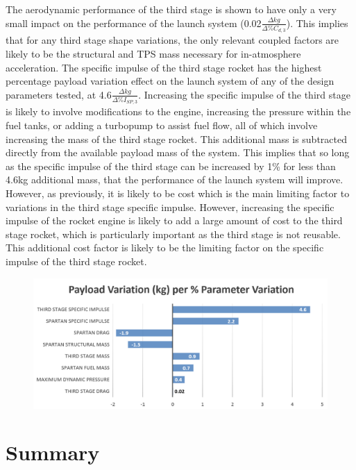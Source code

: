  The aerodynamic performance of the third stage is shown to have only a very small impact on the performance of the launch system (0.02$\frac{\Delta kg}{\Delta\%C_{d,3}}$). This implies that for any third stage shape variations, the only relevant coupled factors are likely to be the structural and TPS mass necessary for in-atmosphere acceleration.
 The specific impulse of the third stage rocket has the highest percentage payload variation effect on the launch system of any of the design parameters tested, at 4.6$\frac{\Delta kg}{\Delta\%I_{SP,3}}$. Increasing the specific impulse of the third stage is likely to involve modifications to the engine, increasing the pressure within the fuel tanks, or adding a turbopump to assist fuel flow, all of which involve increasing the mass of the third stage rocket. 
This additional mass is subtracted directly from the available payload mass of the system. This implies that so long as the specific impulse of the third stage can be increased by 1\% for less than 4.6kg additional mass, that the performance of the launch system will improve. 
However, as previously, it is likely to be cost which is the main limiting factor to variations in the third stage specific impulse. 
 However, increasing the specific impulse of the rocket engine is likely to add a large amount of cost to the third stage rocket, which is particularly important as the third stage is not reusable. This additional cost factor is likely to be the limiting factor on the specific impulse of the third stage rocket. 

\begin{figure}[ht!]
\centering
\includegraphics[width=0.99\linewidth]{figures/5_Ascent/BarChartRelativePayloadChange}
\caption{}
\label{fig:BarChartRelativePayloadChange}
\end{figure}



\section{Summary}



